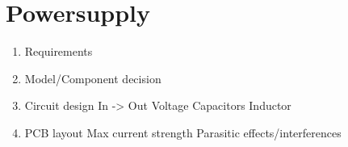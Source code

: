 \section{Powersupply}

\begin{enumerate}
  \item Requirements
  \item Model/Component decision
  \item Circuit design
  \subitem In -> Out Voltage
  \subitem Capacitors
  \subitem Inductor
  \item PCB layout
  \subitem Max current strength
  \subitem Parasitic effects/interferences
\end{enumerate}
